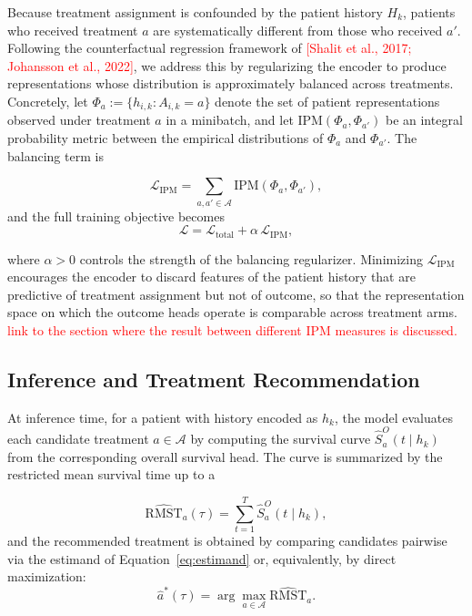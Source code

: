 \documentclass[a4paper,10pt]{article}
\begin{document}
Because treatment assignment is confounded by the patient history $H_k$, patients who received treatment $a$ are systematically different from those who received $a'$. Following the counterfactual regression framework of \textcolor{red}{[Shalit et al., 2017; Johansson et al., 2022]}, we address this by regularizing the encoder to produce representations whose distribution is approximately balanced across treatments. Concretely, let $\Phi_a := \{h_{i,k} : A_{i,k} = a\}$ denote the set of patient representations observed under treatment $a$ in a minibatch, and let $\text{IPM}(\Phi_a, \Phi_{a'})$ be an integral probability metric between the empirical distributions of $\Phi_a$ and $\Phi_{a'}$. The balancing term is

\begin{equation}
    \mathcal{L}_{\text{IPM}} = \sum_{a, a' \in \mathcal{A}} \text{IPM}(\Phi_a, \Phi_{a'}),
\end{equation}
and the full training objective becomes
\begin{equation}
    \mathcal{L} = \mathcal{L}_{\text{total}} + \alpha \, \mathcal{L}_{\text{IPM}},
\end{equation}

where $\alpha > 0$ controls the strength of the balancing regularizer. 
Minimizing $\mathcal{L}_{\text{IPM}}$ encourages the encoder to discard features of the patient history that are predictive of treatment assignment but not of outcome, so that the representation space on which the outcome heads operate is comparable across treatment arms. \textcolor{red}{link to the section where the result between different IPM measures is discussed.}

\subsection{Inference and Treatment Recommendation}
\label{sec:inference}

At inference time, for a patient with history encoded as $h_k$, the model evaluates each candidate treatment $a \in \mathcal{A}$ by computing the survival curve $\hat{S}^O_a(t \mid h_k)$ from the corresponding overall survival head. The curve is summarized by the restricted mean survival time up to a 

\begin{equation}
    \widehat{\text{RMST}}_a(\tau) = \sum_{t=1}^{T} \hat{S}^O_a(t \mid h_k),
\end{equation}
and the recommended treatment is obtained by comparing candidates pairwise via the estimand of Equation~\ref{eq:estimand} or, equivalently, by direct maximization:
\begin{equation}
    \hat{a}^*(\tau) = \arg\max_{a \in \mathcal{A}} \widehat{\text{RMST}}_a.
\end{equation}
\end{document}
